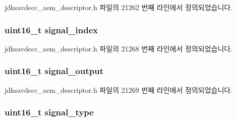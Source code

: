 jdksavdecc\+\_\+aem\+\_\+descriptor.\+h 파일의 21262 번째 라인에서 정의되었습니다.

\subsubsection[{\texorpdfstring{signal\+\_\+index}{signal_index}}]{\setlength{\rightskip}{0pt plus 5cm}uint16\+\_\+t signal\+\_\+index}\hypertarget{structjdksavdecc__descriptor__signal__splitter_ae2e81a95ee9ad83f1fe22b6a1ee29075}{}\label{structjdksavdecc__descriptor__signal__splitter_ae2e81a95ee9ad83f1fe22b6a1ee29075}


jdksavdecc\+\_\+aem\+\_\+descriptor.\+h 파일의 21268 번째 라인에서 정의되었습니다.

\subsubsection[{\texorpdfstring{signal\+\_\+output}{signal_output}}]{\setlength{\rightskip}{0pt plus 5cm}uint16\+\_\+t signal\+\_\+output}\hypertarget{structjdksavdecc__descriptor__signal__splitter_ab4b91864e6fc335d7e86536d9f4461e4}{}\label{structjdksavdecc__descriptor__signal__splitter_ab4b91864e6fc335d7e86536d9f4461e4}


jdksavdecc\+\_\+aem\+\_\+descriptor.\+h 파일의 21269 번째 라인에서 정의되었습니다.

\subsubsection[{\texorpdfstring{signal\+\_\+type}{signal_type}}]{\setlength{\rightskip}{0pt plus 5cm}uint16\+\_\+t signal\+\_\+type}\hypertarget{structjdksavdecc__descriptor__signal__splitter_a248e60ef99d5ed1779989d1dd6b6dc5a}{}\label{structjdksavdecc__descriptor__signal__splitter_a248e60ef99d5ed1779989d1dd6b6dc5a}


